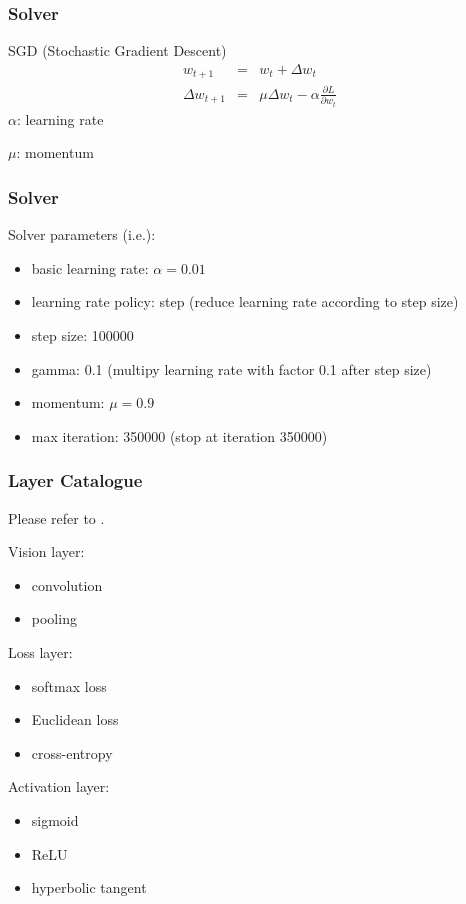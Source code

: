 \documentclass{beamer}
\begin{document}
\begin{frame}[label=solver]
\frametitle{Solver}
SGD (Stochastic Gradient Descent)
\begin{eqnarray*}
w_{t+1}&=&w_{t}+\Delta w_{t}\\
\Delta w_{t+1}&=&\mu\Delta w_{t}-\alpha\frac{\partial L}{\partial w_{t}}
\end{eqnarray*}
$\alpha$: learning rate\par
$\mu$: momentum
\end{frame}

\begin{frame}
\frametitle{Solver}
Solver parameters (i.e.):
\begin{itemize}
\item basic learning rate: $\alpha=0.01$
\item learning rate policy: step (reduce learning rate according to step size)
\item step size: 100000
\item gamma: 0.1 (multipy learning rate with factor 0.1 after step size)
\item momentum: $\mu=0.9$
\item max iteration: 350000 (stop at iteration 350000)
\end{itemize}
\end{frame}

\begin{frame}[label=cata]
\frametitle{Layer Catalogue}
Please refer to \href{http://caffe.berkeleyvision.org/tutorial/layers.html}{\color{blue}{this page}}.\par
Vision layer:
\begin{itemize}
\item convolution
\item pooling
\end{itemize}
Loss layer:
\begin{itemize}
\item softmax loss
\item Euclidean loss
\item cross-entropy
\end{itemize}
Activation layer:
\begin{itemize}
\item sigmoid
\item ReLU
\item hyperbolic tangent
\end{itemize}
\end{frame}
\end{document}
